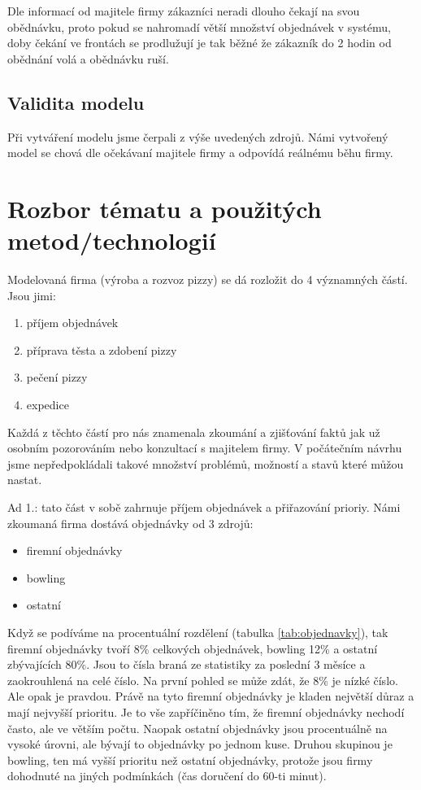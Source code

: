 \documentclass[a4paper, 12pt]{article}[9.12.2013]
\begin{document}
Dle informací od majitele firmy zákazníci neradi dlouho čekají na svou
obědnávku, proto pokud se nahromadí větší množství objednávek v
systému, doby čekání ve frontách se prodlužují je tak běžné že zákazník do 2
hodin od obědnání volá a obědnávku ruší.
\subsection{Validita modelu} \label{uvod:validita}
Při vytváření modelu jsme čerpali z výše uvedených zdrojů. Námi vytvořený model
se chová dle očekávaní majitele firmy a odpovídá reálnému běhu firmy.

\section{Rozbor tématu a použitých metod/technologií} \label{rozbor}
Modelovaná firma (výroba a rozvoz pizzy) se dá rozložit do 4 významných částí.
Jsou jimi:
\begin{enumerate}
    \item příjem objednávek
    \item příprava těsta a zdobení pizzy
    \item pečení pizzy
    \item expedice
\end{enumerate}
Každá z těchto částí pro nás znamenala zkoumání a zjišťování faktů jak už
osobním pozorováním nebo konzultací s majitelem firmy. V počátečním návrhu
jsme nepředpokládali takové množství problémů, možností a stavů které
můžou nastat.

Ad 1.: tato část v sobě zahrnuje příjem objednávek a přiřazování prioriy.
Námi zkoumaná firma dostává objednávky od 3 zdrojů:
\begin{itemize}
\item firemní objednávky
\item bowling
\item ostatní
\end{itemize}

Když se podíváme na procentuální rozdělení (tabulka \ref{tab:objednavky}), tak firemní objednávky
tvoří 8\% celkových objednávek, bowling 12\% a ostatní zbývajících 80\%. Jsou to
čísla braná ze statistiky za poslední 3 měsíce a zaokrouhlená na celé číslo. Na
první pohled se může zdát, že 8\% je nízké číslo. Ale opak je pravdou. Právě na
tyto firemní objednávky je kladen největší důraz a mají nejvyšší prioritu. Je
to vše zapříčiněno tím, že firemní objednávky nechodí často, ale ve větším
počtu. Naopak ostatní objednávky jsou procentuálně na vysoké úrovni, ale bývají
to objednávky po jednom kuse. Druhou skupinou je bowling, ten má vyšší prioritu
než ostatní objednávky, protože jsou firmy dohodnuté na jiných podmínkách
(čas doručení do 60-ti minut).
\end{document}
